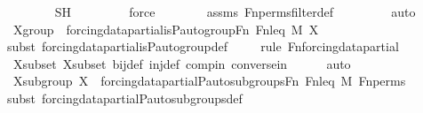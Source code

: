 \begin{isabellebody}
\ \ \ \ \ \ \isamarkupfalse%
\ SH\isanewline
\ \ \ \ \ \ \ \isamarkupfalse%
\ force\isanewline
\ \ \ \ \ \ \isamarkupfalse%
\ assms\ Fn{\isacharunderscore}{\kern0pt}perms{\isacharunderscore}{\kern0pt}filter{\isacharunderscore}{\kern0pt}def\ \isanewline
\ \ \ \ \ \ \isamarkupfalse%
\ auto\isanewline
\ \ \isamarkupfalse%
\isanewline
\isanewline
\ \ \isamarkupfalse%
\ Xgroup\ {\isacharcolon}{\kern0pt}\ {\isachardoublequoteopen}forcing{\isacharunderscore}{\kern0pt}data{\isacharunderscore}{\kern0pt}partial{\isachardot}{\kern0pt}is{\isacharunderscore}{\kern0pt}P{\isacharunderscore}{\kern0pt}auto{\isacharunderscore}{\kern0pt}group{\isacharparenleft}{\kern0pt}Fn{\isacharcomma}{\kern0pt}\ Fn{\isacharunderscore}{\kern0pt}leq{\isacharcomma}{\kern0pt}\ M{\isacharcomma}{\kern0pt}\ X{\isacharparenright}{\kern0pt}{\isachardoublequoteclose}\isanewline
\ \ \ \ \isamarkupfalse%
{\isacharparenleft}{\kern0pt}subst\ forcing{\isacharunderscore}{\kern0pt}data{\isacharunderscore}{\kern0pt}partial{\isachardot}{\kern0pt}is{\isacharunderscore}{\kern0pt}P{\isacharunderscore}{\kern0pt}auto{\isacharunderscore}{\kern0pt}group{\isacharunderscore}{\kern0pt}def{\isacharparenright}{\kern0pt}\isanewline
\ \ \ \ \isamarkupfalse%
{\isacharparenleft}{\kern0pt}rule\ Fn{\isacharunderscore}{\kern0pt}forcing{\isacharunderscore}{\kern0pt}data{\isacharunderscore}{\kern0pt}partial{\isacharparenright}{\kern0pt}\isanewline
\ \ \ \ \isamarkupfalse%
\ Xsubset{\isacharprime}{\kern0pt}\ Xsubset{\isacharprime}{\kern0pt}{\isacharprime}{\kern0pt}\ bij{\isacharunderscore}{\kern0pt}def\ inj{\isacharunderscore}{\kern0pt}def\ compin\ conversein\isanewline
\ \ \ \ \isamarkupfalse%
\ auto\isanewline
\isanewline
\ \ \isamarkupfalse%
\ Xsubgroup\ {\isacharcolon}{\kern0pt}{\isachardoublequoteopen}X\ {\isasymin}\ forcing{\isacharunderscore}{\kern0pt}data{\isacharunderscore}{\kern0pt}partial{\isachardot}{\kern0pt}P{\isacharunderscore}{\kern0pt}auto{\isacharunderscore}{\kern0pt}subgroups{\isacharparenleft}{\kern0pt}Fn{\isacharcomma}{\kern0pt}\ Fn{\isacharunderscore}{\kern0pt}leq{\isacharcomma}{\kern0pt}\ M{\isacharcomma}{\kern0pt}\ Fn{\isacharunderscore}{\kern0pt}perms{\isacharparenright}{\kern0pt}{\isachardoublequoteclose}\ \isanewline
\ \ \ \ \isamarkupfalse%
{\isacharparenleft}{\kern0pt}subst\ forcing{\isacharunderscore}{\kern0pt}data{\isacharunderscore}{\kern0pt}partial{\isachardot}{\kern0pt}P{\isacharunderscore}{\kern0pt}auto{\isacharunderscore}{\kern0pt}subgroups{\isacharunderscore}{\kern0pt}def{\isacharparenright}{\kern0pt}\isanewline

\end{isabellebody}

